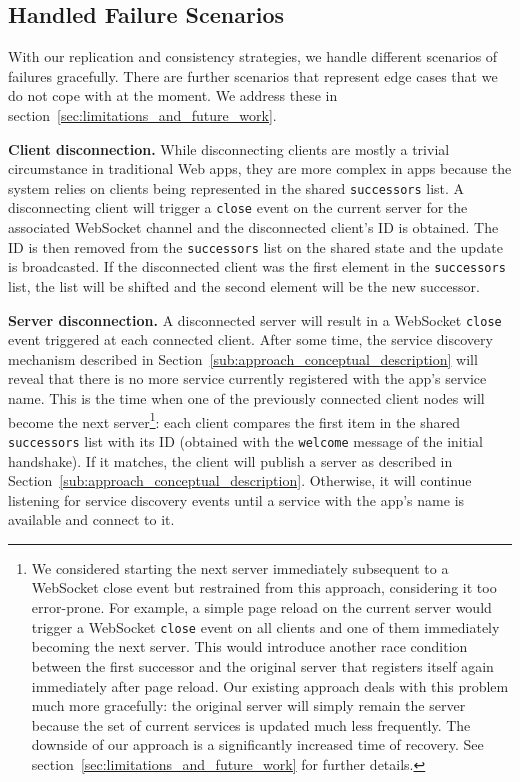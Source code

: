 \subsection{Handled Failure Scenarios}
\label{sub:approach_handled_failure_scenarios}

With our replication and consistency strategies, we handle different scenarios of failures gracefully. There are further scenarios that represent edge cases that we do not cope with at the moment. 
We address these in section~\ref{sec:limitations_and_future_work}.

\textbf{Client disconnection.} 
While disconnecting clients are mostly a trivial circumstance in traditional Web apps, they are more complex in \APIshort apps because the system relies on clients being represented in the shared \texttt{successors} list. 
A disconnecting client will trigger a \texttt{close} event on the current server for the associated WebSocket channel and the disconnected client's ID is obtained. 
The ID is then removed from the \texttt{successors} list on the shared state and the update is broadcasted. 
If the disconnected client was the first element in the \texttt{successors} list, the list will be shifted and the second element will be the new successor.

\textbf{Server disconnection.} 
A disconnected server will result in a WebSocket \texttt{close} event triggered at each connected client. 
After some time, the service discovery mechanism described in Section~\ref{sub:approach_conceptual_description} will reveal that there is no more service currently registered with the app's service name. 
This is the time when one of the previously connected client nodes will become the next server\footnote{We considered starting the next server immediately subsequent to a WebSocket close event but restrained from this approach, considering it too error-prone. For example, a simple page reload on the current server would trigger a WebSocket \texttt{close} event on all clients and one of them immediately becoming the next server. This would introduce another race condition between the first successor and the original server that registers itself again immediately after page reload. Our existing approach deals with this problem much more gracefully: the original server will simply remain the server because the set of current services is updated much less frequently. The downside of our approach is a significantly increased time of recovery. See section~\ref{sec:limitations_and_future_work} for further details.}: each client compares the first item in the shared \texttt{successors} list with its ID (obtained with the \texttt{welcome} message of the initial handshake). 
If it matches, the client will publish a server as described in Section~\ref{sub:approach_conceptual_description}. 
Otherwise, it will continue listening for service discovery events until a service with the app's name is available and connect to it.

